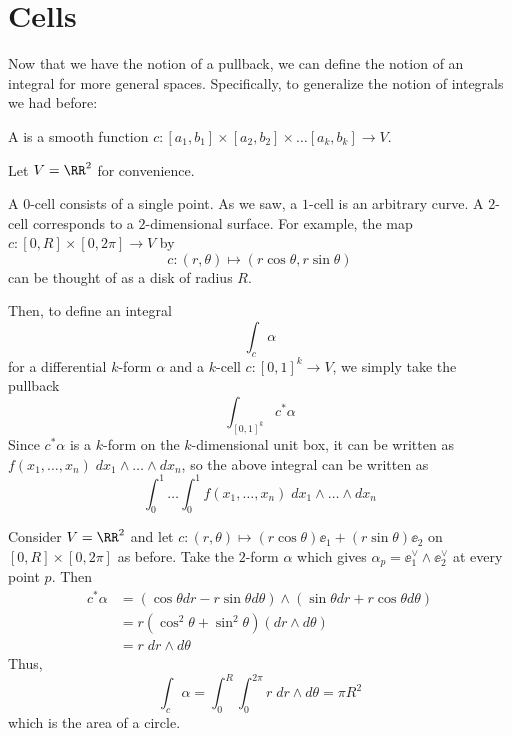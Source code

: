\section{Cells}
Now that we have the notion of a pullback,
we can define the notion of an integral for more general spaces.
Specifically, to generalize the notion of integrals we had before:
\begin{definition}
	A  is a smooth function $c : [a_1, b_1] \times [a_2,b_2] \times \dots [a_k, b_k] \to V$.
\end{definition}
\begin{example}
	Let $V = \RR^2$ for convenience.
	\begin{enumerate}[(a)]
		\ii A $0$-cell consists of a single point.
		\ii As we saw, a $1$-cell is an arbitrary curve.
		\ii A $2$-cell corresponds to a $2$-dimensional surface.
		For example, the map $c : [0,R] \times [0,2\pi] \to V$ by
		\[ c : (r,\theta) \mapsto (r\cos\theta, r\sin\theta) \]
		can be thought of as a disk of radius $R$.
	\end{enumerate}
\end{example}
Then, to define an integral
\[ \int_c \alpha \]
for a differential $k$-form $\alpha$ and a $k$-cell $c : [0,1]^k \to V$,
we simply take the pullback
\[ \int_{[0,1]^k} c^\ast \alpha \]
Since $c^\ast \alpha$ is a $k$-form on the $k$-dimensional unit box,
it can be written as $f(x_1, \dots, x_n) \; dx_1 \wedge \dots \wedge dx_n$,
so the above integral can be written as
\[ \int_0^1 \dots \int_0^1 f(x_1, \dots, x_n) \; dx_1 \wedge \dots \wedge dx_n \]

\begin{example}
	Consider $V = \RR^2$ and let $c : (r,\theta) \mapsto (r\cos\theta)\ee_1 + (r\sin\theta)\ee_2$
	on $[0,R] \times [0,2\pi]$ as before.
	Take the $2$-form $\alpha$ which gives $\alpha_p = \ee_1^\vee \wedge \ee_2^\vee$ at every point $p$.
	Then
	\begin{align*}
		c^\ast\alpha &= 
		\left( \cos\theta dr - r\sin\theta d\theta \right)
		\wedge
		\left( \sin\theta dr + r\cos\theta d\theta \right) \\
		&= r(\cos^2\theta+\sin^2\theta) (dr \wedge d\theta) \\
		&= r \; dr \wedge d\theta
	\end{align*}
	Thus,
	\[ \int_c \alpha
		= \int_0^R \int_0^{2\pi} r \; dr \wedge d\theta
		= \pi R^2 \]
	which is the area of a circle.
\end{example}


